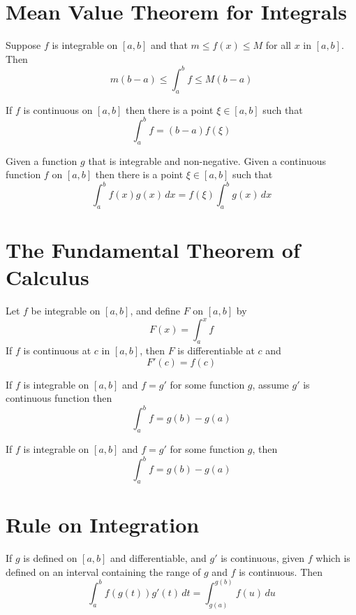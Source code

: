 \section{Mean Value Theorem for Integrals}
\begin{theorem*}
  Suppose $f$ is integrable on $[a, b]$ and that $m \le f(x) \le M$ for all $x$ in $[a, b]$.
  Then 
  \[m(b-a) \le \int_a^b f \le M(b-a)\]
\end{theorem*}
\begin{theorem*}
  If $f$ is continuous on $[a, b]$ then there is a point $\xi \in [a, b]$ such that 
  \[\int_a^b f = (b-a)f(\xi)\]
\end{theorem*}
\begin{theorem*}
  Given a function $g$ that is integrable and non-negative. Given a continuous function $f$ on $[a, b]$ then
  there is a point $\xi \in [a, b]$ such that 
  \[ \int_a^b f(x)g(x)\,dx = f(\xi)\int_a^b g(x)\,dx\]
\end{theorem*}

\section{The Fundamental Theorem of Calculus}

\begin{theorem*}
  Let $f$ be integrable on $[a, b]$, and define $F$ on $[a, b]$ by
  \[F(x) = \int_a^x f\]
  If $f$ is continuous at $c$ in $[a, b]$, then $F$ is differentiable at $c$ and 
  \[F'(c) = f(c)\]
\end{theorem*}

\begin{theorem*}
  If $f$ is integrable on $[a, b]$ and $f = g'$ for some function $g$, assume $g'$ is continuous function then 
  \[\int_a^b f = g(b) - g(a)\]
\end{theorem*}

\begin{theorem*}
  If $f$ is integrable on $[a, b]$ and $f = g'$ for some function $g$, then 
  \[\int_a^b f = g(b) - g(a)\]
\end{theorem*}

\section{Rule on Integration}

\begin{theorem*}
  If $g$ is defined on $[a, b]$ and differentiable, and $g'$ is continuous, given $f$ which is defined on an interval containing the range of $g$ and $f$ is continuous.
  Then
  \[\int_a^bf(g(t))g'(t)\,dt = \int_{g(a)}^{g(b)}f(u)\,du\]
\end{theorem*}

